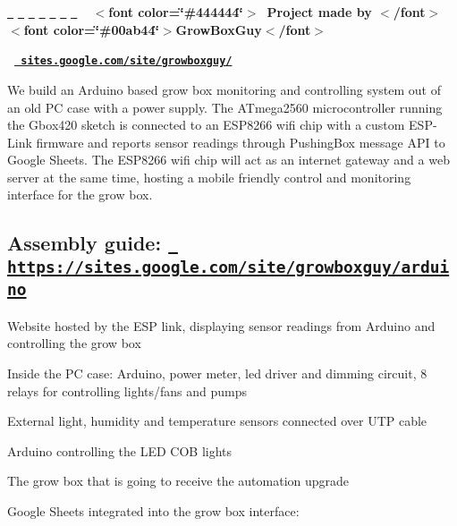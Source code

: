   \href{https://www.patreon.com/growboxguy}{\texttt{ }} \href{https://www.facebook.com/Gbox420-1495966037151416/}{\texttt{ }} \href{https://github.com/growboxguy/Gbox420}{\texttt{ }} \href{https://plus.google.com/106380858241253565250}{\texttt{ }} \href{https://www.tumblr.com/blog/growboxguy}{\texttt{ }} \href{https://twitter.com/growboxguy}{\texttt{ }} \href{mailto:GrowBoxGuy@gmail.com}{\texttt{ }} ~\newline
  {\bfseries{ $<$font color=\char`\"{}\#444444\char`\"{}$>$~Project made by $<$/font$>$ $<$font color=\char`\"{}\#00ab44\char`\"{}$>$Grow\+Box\+Guy$<$/font$>$~\newline
}}

{\bfseries{~\href{http://sites.google.com/site/growboxguy/}{\texttt{ sites.\+google.\+com/site/growboxguy/}} }} ~\newline


 We build an Arduino based grow box monitoring and controlling system out of an old PC case with a power supply. The A\+Tmega2560 microcontroller running the Gbox420 sketch is connected to an E\+S\+P8266 wifi chip with a custom E\+S\+P-\/\+Link firmware and reports sensor readings through Pushing\+Box message A\+PI to Google Sheets. The E\+S\+P8266 wifi chip will act as an internet gateway and a web server at the same time, hosting a mobile friendly control and monitoring interface for the grow box. 

\subsection*{Assembly guide\+: \href{https://sites.google.com/site/growboxguy/arduino}{\texttt{ https\+://sites.\+google.\+com/site/growboxguy/arduino}}}

 



Website hosted by the E\+SP link, displaying sensor readings from Arduino and controlling the grow box 

Inside the PC case\+: Arduino, power meter, led driver and dimming circuit, 8 relays for controlling lights/fans and pumps 

External light, humidity and temperature sensors connected over U\+TP cable 

Arduino controlling the L\+ED C\+OB lights 

The grow box that is going to receive the automation upgrade 

Google Sheets integrated into the grow box interface\+: 

 